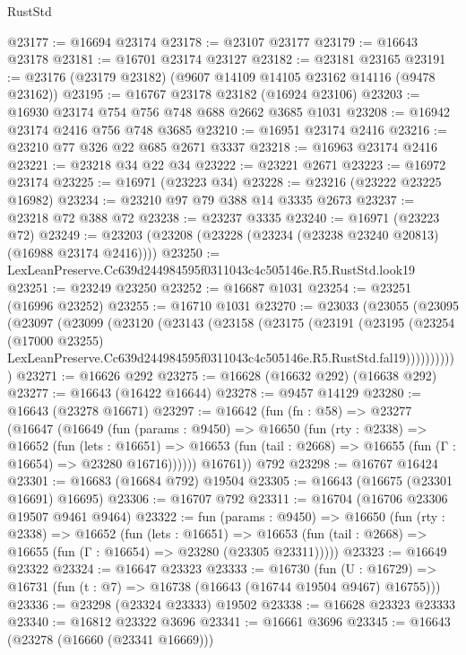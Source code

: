 \begin{lexlean}{RustStd}
\begin{coremodule}
@23177 := @16694 @23174
@23178 := @23107 @23177
@23179 := @16643 @23178
@23181 := @16701 @23174 @23127
@23182 := @23181 @23165
@23191 := @23176 (@23179 @23182) (@9607 @14109 @14105 @23162 @14116 (@9478 @23162))
@23195 := @16767 @23178 @23182 (@16924 @23106)
@23203 := @16930 @23174 @754 @756 @748 @688 @2662 @3685 @1031
@23208 := @16942 @23174 @2416 @756 @748 @3685
@23210 := @16951 @23174 @2416
@23216 := @23210 @77 @326 @22 @685 @2671 @3337
@23218 := @16963 @23174 @2416
@23221 := @23218 @34 @22 @34
@23222 := @23221 @2671
@23223 := @16972 @23174
@23225 := @16971 (@23223 @34)
@23228 := @23216 (@23222 @23225 @16982)
@23234 := @23210 @97 @79 @388 @14 @3335 @2673
@23237 := @23218 @72 @388 @72
@23238 := @23237 @3335
@23240 := @16971 (@23223 @72)
@23249 := @23203 (@23208 (@23228 (@23234 (@23238 @23240 @20813) (@16988 @23174 @2416))))
@23250 := LexLeanPreserve.Cc639d244984595f0311043c4c505146e.R5.RustStd.look19
@23251 := @23249 @23250
@23252 := @16687 @1031
@23254 := @23251 (@16996 @23252)
@23255 := @16710 @1031
@23270 := @23033
    (@23055
      (@23095
        (@23097
          (@23099
            (@23120
              (@23143
                (@23158
                  (@23175
                    (@23191
                      (@23195
                        (@23254
                          (@17000 @23255)
                          LexLeanPreserve.Cc639d244984595f0311043c4c505146e.R5.RustStd.fal19)))))))))))
@23271 := @16626 @292
@23275 := @16628 (@16632 @292) (@16638 @292)
@23277 := @16643 (@16422 @16644)
@23278 := @9457 @14129
@23280 := @16643 (@23278 @16671)
@23297 := @16642
    (fun (fn : @58) =>
    @23277
      (@16647
        (@16649
          (fun (params : @9450) =>
          @16650
            (fun (rty : @2338) =>
            @16652
              (fun (lets : @16651) =>
              @16653 (fun (tail : @2668) => @16655 (fun (Γ : @16654) => @23280 @16716))))))
        @16761))
    @792
@23298 := @16767 @16424
@23301 := @16683 (@16684 @792) @19504
@23305 := @16643 (@16675 (@23301 @16691) @16695)
@23306 := @16707 @792
@23311 := @16704 (@16706 @23306 @19507 @9461 @9464)
@23322 := fun (params : @9450) =>
  @16650
    (fun (rty : @2338) =>
    @16652
      (fun (lets : @16651) =>
      @16653 (fun (tail : @2668) => @16655 (fun (Γ : @16654) => @23280 (@23305 @23311)))))
@23323 := @16649 @23322
@23324 := @16647 @23323
@23333 := @16730
    (fun (U : @16729) => @16731 (fun (t : @7) => @16738 (@16643 (@16744 @19504 @9467) @16755)))
@23336 := @23298 (@23324 @23333) @19502
@23338 := @16628 @23323 @23333
@23340 := @16812 @23322 @3696
@23341 := @16661 @3696
@23345 := @16643 (@23278 (@16660 (@23341 @16669)))

\end{coremodule}
\end{lexlean}
